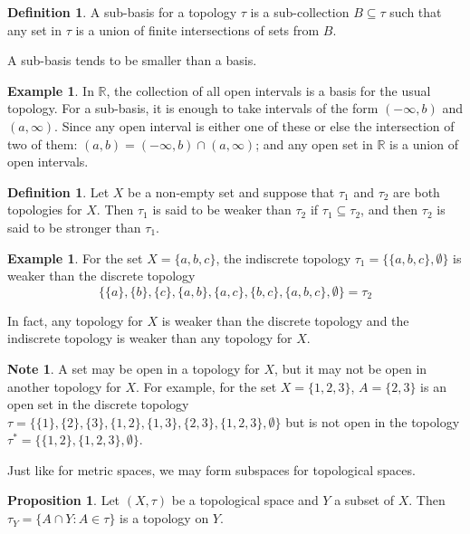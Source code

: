 \documentclass[11pt,a4paper]{article}
\theoremstyle{definition}
\newtheorem{defn}[thm]{Definition}
\newtheorem{exa}[thm]{Example}
\newtheorem{prop}[thm]{Proposition}
\newtheorem*{note}{Note}
\begin{document}
\begin{defn}
A sub-basis for a topology $\tau$ is a sub-collection $B\subseteq \tau$ such that any set in $\tau$ is a union of finite intersections of sets from $B$.
\end{defn}

A sub-basis tends to be smaller than a basis.



\begin{exa}
In $\mathbb{R}$, the collection of all open intervals is a basis for the usual topology. For a sub-basis, it is enough to take intervals of the form $(-\infty,b)$ and $(a,\infty)$. Since any open interval is either one of these or else the intersection of two of them: $(a,b)=(-\infty,b)\cap (a,\infty)$; and any open set in $\mathbb{R}$ is a union of open intervals.
\end{exa}




\begin{defn}
Let $X$ be a non-empty set and suppose that $\tau_1$ and $\tau_2$ are both topologies for $X$. Then $\tau_1$ is said to be weaker than $\tau_2$ if $\tau_1 \subseteq \tau_2$, and then $\tau_2$ is said to be stronger than $\tau_1$.
\end{defn}



\begin{exa}
For the set $X=\{a,b,c\}$, the indiscrete topology $\tau_1=\{\{a,b,c\},\emptyset \}$ is weaker than the discrete topology $$\{\{a\},\{b\},\{c\},\{a,b\},\{a,c\},\{b,c\},\{a,b,c\},\emptyset \}=\tau_2$$
\end{exa}


In fact, any topology for $X$ is weaker than the discrete topology and the indiscrete topology is weaker than any topology for $X$.




\begin{note}
A set may be open in a topology for $X$, but it may not be open in another topology for $X$. For example, for the set $X=\{1,2,3\}$, $A=\{2,3\}$ is an open set in the discrete topology $\tau =\{\{1\},\{2\},\{3\},\{1,2\},\{1,3\},\{2,3\},\{1,2,3\},\emptyset\}$ but is not open in the topology $\tau^* =\{\{1,2\},\{1,2,3\},\emptyset\}$.
\end{note}

Just like for metric spaces, we may form subspaces for topological spaces.

\begin{prop}
Let $(X,\tau)$ be a topological space and $Y$ a subset of $X$. Then $\tau_Y=\{A\cap Y:A\in \tau \}$ is a topology on $Y$.
\end{prop}
\end{document}
